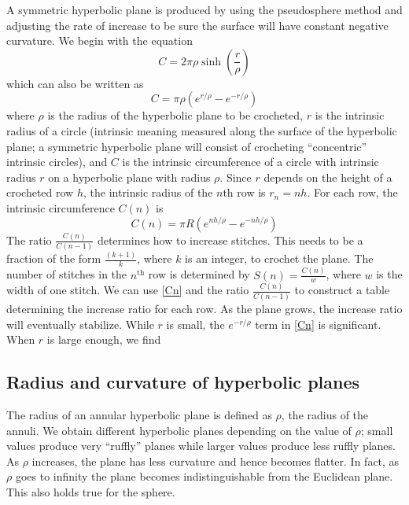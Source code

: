 \documentclass[letterpaper,titlepage]{article}
\begin{document}
A symmetric hyperbolic plane is produced by using the pseudosphere method and adjusting the rate of increase to be sure the surface will have constant negative curvature. We begin with the equation
\begin{equation}
C = 2 \pi \rho \sinh \left( \frac{r}{\rho} \right)
\label{Csinh}
\end{equation}
which can also be written as
\begin{equation}
C = \pi \rho \left( e^{r/\rho} - e^{-r/\rho} \right)
\label{Ce}
\end{equation}
where $\rho$ is the radius of the hyperbolic plane to be crocheted, $r$ is the intrinsic radius of a circle (intrinsic meaning measured along the surface of the hyperbolic plane; a symmetric hyperbolic plane will consist of crocheting ``concentric'' intrinsic circles), and $C$ is the intrinsic circumference of a circle with intrinsic radius $r$ on a hyperbolic plane with radius $\rho$.
Since $r$ depends on the height of a crocheted row $h$, the intrinsic radius of the $n$th row is $r_n = nh$.
For each row, the intrinsic circumference $C(n)$ is
\begin{equation}
C(n) = \pi R \left( e^{nh/\rho} - e^{-nh/\rho} \right)
\label{Cn}
\end{equation}
The ratio $\frac{C(n)}{C(n-1)}$ determines how to increase stitches.
This needs to be a fraction of the form $\frac{(k+1)}{k}$, where $k$ is an integer, to crochet the plane.
The number of stitches in the $n^{\text{th}}$ row is determined by $S(n) = \frac{C(n)}{w}$, where $w$ is the width of one stitch.
We can use \eqref{Cn} and the ratio $\frac{C(n)}{C(n-1)}$ to construct a table determining the increase ratio for each row.
As the plane grows, the increase ratio will eventually stabilize.
While $r$ is small, the $e^{-r/\rho}$ term in \eqref{Cn} is significant.
When $r$ is large enough, we find 

\subsection{Radius and curvature of hyperbolic planes}
\label{hradius}
The radius of an annular hyperbolic plane is defined as $\rho$, the radius of the annuli.
We obtain different hyperbolic planes depending on the value of $\rho$; small values produce very ``ruffly'' planes while larger values produce less ruffly planes.
As $\rho$ increases, the plane has less curvature and hence becomes flatter.
In fact, as $\rho$ goes to infinity the plane becomes indistinguishable from the Euclidean plane.
This also holds true for the sphere.
\end{document}
